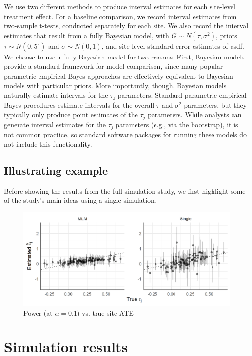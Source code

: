 \documentclass[]{article}
\begin{document}
We use two different methods to produce interval estimates for each site-level treatment effect.
For a baseline comparison, we record interval estimates from two-sample t-tests, conducted separately for each site.
We also record the interval estimates that result from a fully Bayesian model, with $G \sim N(\tau, \sigma^2)$, priors $\tau \sim N(0,5^2)$ and $\sigma \sim N(0,1)$, and site-level standard error estimates of asdf.
We choose to use a fully Bayesian model for two reasons.
First, Bayesian models provide a standard framework for model comparison, since many popular parametric empirical Bayes approaches are effectively equivalent to Bayesian models with particular priors.
More importantly, though, Bayesian models naturally estimate intervals for the $\tau_j$ parameters.
Standard parametric empirical Bayes procedures estimate intervals for the overall $\tau$ and $\sigma^2$ parameters, but they typically only produce point estimates of the $\tau_j$ parameters.
While analysts can generate interval estimates for the $\tau_j$ parameters (e.g., via the bootstrap), it is not common practice, so standard software packages for running these models do not include this functionality.


\subsection{Illustrating example}

Before showing the results from the full simulation study, we first highlight some of the study's main ideas using a single simulation.

\begin{figure}[ht]
	\centering
	\includegraphics[width=\textwidth]{shrinkageplot}
	\caption{Power (at $\alpha = 0.1$) vs. true site ATE}
	\label{fig:example}
\end{figure}


\section{Simulation results}
\end{document}
